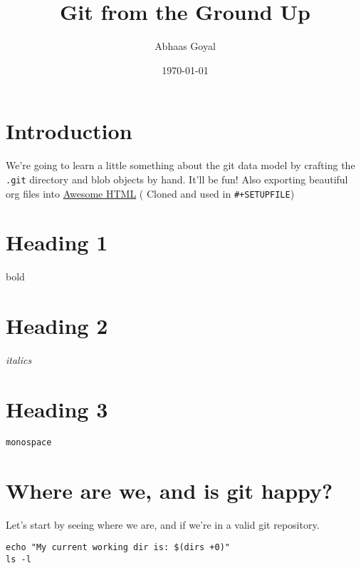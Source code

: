 \documentclass[11pt]{article}
\author{Abhaas Goyal}
\date{\today}
\title{Git from the Ground Up}
\begin{document}
\maketitle
\tableofcontents

\section{Introduction}
\label{sec:org0fe7799}
We're going to learn a little something about the git data model by crafting the \texttt{.git} directory and  blob objects by hand. It'll be fun! Also exporting beautiful org files into \href{https://github.com/fniessen/org-html-themes}{Awesome HTML} ( Cloned and used in \texttt{\#+SETUPFILE})

\section{Heading 1}
\label{sec:org9dc6a58}
bold
\section{Heading 2}
\label{sec:org807bc0d}
\emph{italics}
\section{Heading 3}
\label{sec:org144f4b3}
\texttt{monospace}

\section{Where are we, and is git happy?}
\label{sec:orgf78f9d8}
Let's start by seeing where we are, and if we're in a valid git repository.

\begin{verbatim}
echo "My current working dir is: $(dirs +0)"
ls -l
\end{verbatim}
\end{document}
